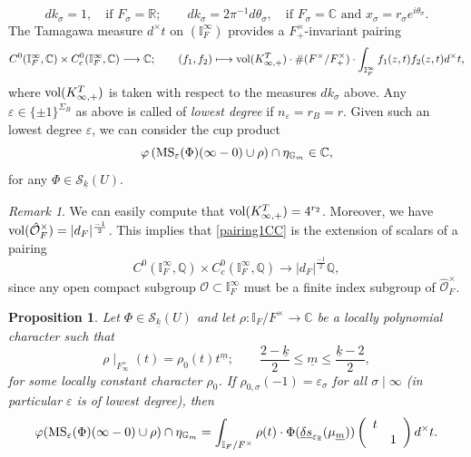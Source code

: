 \documentclass{amsart}
\newtheorem{proposition}[theorem]{Proposition}
\theoremstyle{definition}
\theoremstyle{remark}
\newtheorem{remark}[theorem]{Remark}
\numberwithin{equation}{section}
\newcommand{\Q}{{\mathbb Q}}
\newcommand{\C}{{\mathbb C}}
\newcommand{\R}{{\mathbb R}}
\newcommand{\G}{{\mathbb G}}
\newcommand{\I}{{\mathbb I}}
\newcommand{\cS}{{\mathcal S}}
\newcommand{\cO}{{\mathcal O}}
\begin{document}
\[
d k_\sigma=1,\quad\mbox{if }F_\sigma=\R;\qquad d k_\sigma=2\pi^{-1}d\theta_\sigma,\quad\mbox{if }F_\sigma=\C\mbox{ and }x_\sigma=r_\sigma e^{i\theta_\sigma}.
\]
The Tamagawa measure $d^\times t$ on $(\I_F^\infty)$ provides a $F_+^\times$-invariant pairing 
\begin{equation}\label{pairing1CC}
    C^0(\I_F^\infty,\C)\times C_c^0(\I_F^\infty,\C)\longrightarrow\C;\qquad (f_1,f_2)\longmapsto {\rm vol}(K^T_{\infty,+})\cdot\#( F^\times/F^\times_+)\cdot\int_{\I_F^\infty}f_1(z,t)f_2(z,t)d^\times t,
\end{equation}
where ${\rm vol}(K^T_{\infty,+})$ is taken with respect to the measures $dk_\sigma$ above. Any $\varepsilon\in \{\pm 1\}^{\Sigma_B}$ as above is called of \emph{lowest degree} if $n_\varepsilon=r_B=r$. Given such an lowest degree $\varepsilon$, we can consider the cup product
\[
\varphi\left({\rm MS}_\varepsilon(\Phi)(\infty-0)\cup\rho\right)\cap\eta_{\G_m}\in \C,
\]
for any $\Phi\in \cS_{\underline k}(U)$.
\begin{remark}\label{algebraicitypairing1}
    We can easily compute that ${\rm vol}(K^T_{\infty,+})=4^{r_2}$. Moreover, we have ${\rm vol}(\hat\cO_F^\times)=|d_F|^{\frac{-1}{2}}$. This implies that \eqref{pairing1CC} is the extension of scalars of a pairing
    \[
    C^0(\I^\infty_F,\Q)\times C_c^0(\I^\infty_F,\Q)\longrightarrow |d_F|^{\frac{-1}{2}}\Q,
    \]
    since any open compact subgroup $\cO\subset \I_F^\infty$ must be a finite index subgroup of $\hat\cO_F^\times$. 
\end{remark}
\begin{proposition}\label{ThmintMS}
Let $\Phi\in \cS_{\underline k}(U)$ and let $\rho:\I_F/F^\times\rightarrow\C$ be a locally polynomial character such that 
\[
\rho\mid_{F_\infty^\times}(t)=\rho_0(t)t^{\underline m};\qquad \frac{2-\underline k}{2}\leq\underline m\leq \frac{\underline k-2}{2},
\]
for some locally constant character $\rho_0$. If $\rho_{0,\sigma}(-1)=\varepsilon_\sigma$ for all $\sigma\mid\infty$ (in particular $\varepsilon$ is of lowest degree), then 
\[
\varphi({\rm MS}_\varepsilon(\Phi)(\infty-0)\cup\rho)\cap \eta_{\G_m}=\int_{\I_F/F^\times}\rho(t)\cdot \Phi(\underline{\delta s}_{\varepsilon_\R}(\mu_{\underline{m}}))\left(\begin{array}{cc}
t     &  \\
     & 1
\end{array}\right)d^\times t.
\]
\end{proposition}
\end{document}
